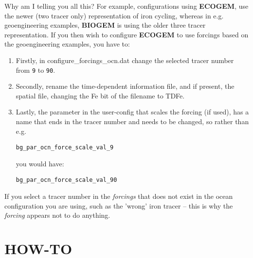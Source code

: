 \documentclass[11pt,fleqn]{book} %
\begin{document}
Why am I telling you all this? For example, configurations using \textbf{ECOGEM}, use the newer (two tracer only) representation of iron cycling, whereas in e.g. geoengineering examples, \textbf{BIOGEM} is using the older three tracer representation. If you then wish to configure \textbf{ECOGEM} to use forcings based on the geoengineering examples, you have to:

\begin{enumerate}[noitemsep]
\item Firstly, in \textsf{\footnotesize configure\_forcings\_ocn.dat} change the selected tracer number from \texttt{9} to \texttt{90}.
\item Secondly, rename the time-dependent information file, and if present, the spatial file, changing the \textsf{\footnotesize Fe} bit of the filename to \textsf{\footnotesize TDFe}.
\item Lastly, the parameter in the user-config that scales the forcing (if used), has a name that ends in the tracer number and needs to be changed, so rather than e.g.
\vspace{-1mm}\small\begin{verbatim}
bg_par_ocn_force_scale_val_9
\end{verbatim}\vspace{-1mm}\normalsize
you would have:
\vspace{-1mm}\small\begin{verbatim}
bg_par_ocn_force_scale_val_90
\end{verbatim}\vspace{-1mm}\normalsize

\end{enumerate}

If you select a tracer number in the \textit{forcings} that does not exist in the ocean configuration you are using, such as the 'wrong' iron tracer -- this is why the \textit{forcing} appears not to do anything.


\cleardoublepage


\chapter{HOW-TO}
\end{document}
